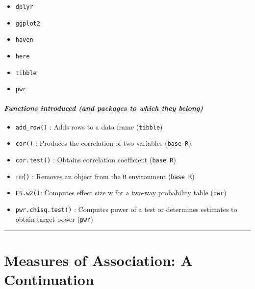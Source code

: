 \documentclass[
]{book}
\providecommand{\tightlist}{%
  \setlength{\itemsep}{0pt}\setlength{\parskip}{0pt}}
\begin{document}
\begin{itemize}
\tightlist
\item
  \texttt{dplyr}
\item
  \texttt{ggplot2}
\item
  \texttt{haven}
\item
  \texttt{here}
\item
  \texttt{tibble}
\item
  \texttt{pwr}
\end{itemize}

\hypertarget{functions-introduced-and-packages-to-which-they-belong-7}{%
\paragraph*{\texorpdfstring{\emph{Functions introduced (and packages to which they belong)}}{Functions introduced (and packages to which they belong)}}\label{functions-introduced-and-packages-to-which-they-belong-7}}

\begin{itemize}
\tightlist
\item
  \texttt{add\_row()} : Adds rows to a data frame (\texttt{tibble})
\item
  \texttt{cor()} : Produces the correlation of two variables (\texttt{base\ R})
\item
  \texttt{cor.test()} : Obtains correlation coefficient (\texttt{base\ R})
\item
  \texttt{rm()} : Removes an object from the \texttt{R} environment (\texttt{base\ R})
\item
  \texttt{ES.w2()}: Computes effect size w for a two-way probability table (\texttt{pwr})
\item
  \texttt{pwr.chisq.test()} : Computes power of a test or determines estimates to obtain target power (\texttt{pwr})
\end{itemize}

\begin{center}\rule{0.5\linewidth}{0.5pt}\end{center}

\hypertarget{measures-of-association-a-continuation}{%
\section{Measures of Association: A Continuation}\label{measures-of-association-a-continuation}}
\end{document}
